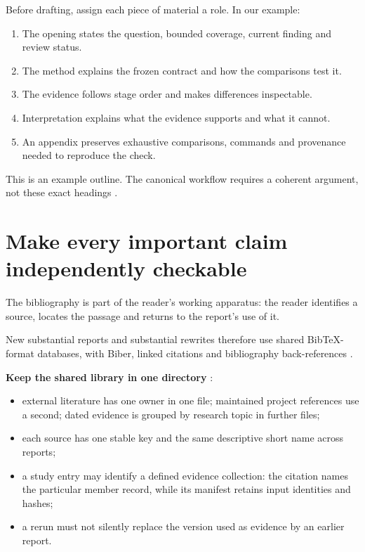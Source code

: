 Before drafting, assign each piece of material a role. In our example:
\begin{enumerate}
  \item The opening states the question, bounded coverage, current finding and review status.
  \item The method explains the frozen contract and how the comparisons test it.
  \item The evidence follows stage order and makes differences inspectable.
  \item Interpretation explains what the evidence supports and what it cannot.
  \item An appendix preserves exhaustive comparisons, commands and provenance needed to reproduce
        the check.
\end{enumerate}
This is an example outline. The canonical workflow requires a coherent argument, not these
exact headings \cite[Design the argument]{skill:report-production}.

\section{Make every important claim independently checkable}

\begin{headline}
  The bibliography is part of the reader's working apparatus: the reader identifies a
  source, locates the passage and returns to the report's use of it.
\end{headline}

New substantial reports and substantial rewrites therefore use shared BibTeX-format
 databases,  with Biber, linked citations and bibliography
back-references \cite[Bibliography and reader-verifiable
  pinpoints]{skill:report-production}.

\textbf{Keep the shared library in one directory}
\cite[Register the source you actually inspected]{skill:library}:
\begin{itemize}
  \item external literature has one owner in one file; maintained project references use a
        second; dated evidence is grouped by research topic in further files;
  \item each source has one stable key and the same descriptive short name across reports;
  \item a study entry may identify a defined evidence collection: the citation names the
        particular member record, while its manifest retains input identities and hashes;
  \item a rerun must not silently replace the version used as evidence by an earlier report.
\end{itemize}

